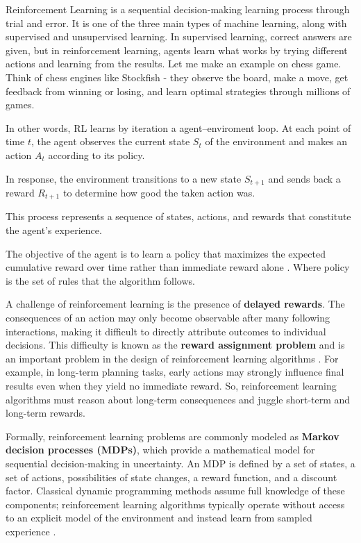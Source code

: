 Reinforcement Learning is a sequential decision-making learning process through trial and error. It is one of the three main types of machine learning, along with supervised and unsupervised learning. In supervised learning, correct answers are given, but in reinforcement learning, agents learn what works by trying different actions and learning from the results. Let me make an example on chess game. Think of chess engines like Stockfish - they observe the board, make a move, get feedback from winning or losing, and learn optimal strategies through millions of games.


In other words, RL learns by iteration a agent--enviroment loop. At each point of time $t$, the agent observes the current state $S_t$ of the environment and makes an action $A_t$ according to its policy.


In response, the environment transitions to a new state $S_{t+1}$ and sends back a reward $R_{t+1}$ to determine how good the taken action was. 


This process represents a sequence of states, actions, and rewards that constitute the agent’s experience. 


The objective of the agent is to learn a policy that maximizes the expected cumulative reward over time rather than immediate reward alone \cite{barto1989learning}. Where policy is the set of rules that the algorithm follows.


A challenge of reinforcement learning is the presence of \textbf{delayed rewards}. The consequences of an action may only become observable after many following interactions, making it difficult to directly attribute outcomes to individual decisions. This difficulty is known as the \textbf{reward assignment problem} and is an important problem in the design of reinforcement learning algorithms \cite{sutton}. For example, in long-term planning tasks, early actions may strongly influence final results even when they yield no immediate reward. So, reinforcement learning algorithms must reason about long-term consequences and juggle short-term and long-term rewards.

Formally, reinforcement learning problems are commonly modeled as \textbf{Markov decision processes (MDPs)}, which provide a mathematical model for sequential decision-making in uncertainty. An MDP is defined by a set of states, a set of actions, possibilities of state changes, a reward function, and a discount factor. Classical dynamic programming methods assume full knowledge of these components; reinforcement learning algorithms typically operate without access to an explicit model of the environment and instead learn from sampled experience \cite{kaelbling1996}.




